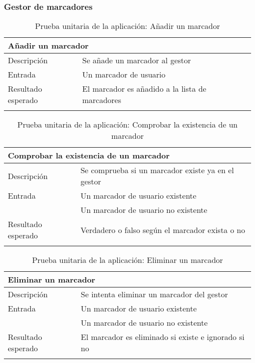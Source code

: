 \subsubsection{Gestor de marcadores}

\begin{longtable}{|p{} p{}|}
    \hline
    \multicolumn{2}{|l|}{\textbf{Añadir un marcador}} \\ \hline 
    Descripción                 & Se añade un marcador al gestor \\ \hline
    Entrada                     & Un marcador de usuario \\ \hline
    Resultado esperado          & El marcador es añadido a la lista de marcadores \\ \hline
    \caption{Prueba unitaria de la aplicación: Añadir un marcador}
    \label{cp:u:app:añadir_marcador}
\end{longtable}

\begin{longtable}{|p{} p{}|}
    \hline
    \multicolumn{2}{|l|}{\textbf{Comprobar la existencia de un marcador}} \\ \hline 
    Descripción                 & Se comprueba si un marcador existe ya en el gestor \\ \hline
    Entrada                     & Un marcador de usuario existente \\
                                & Un marcador de usuario no existente \\\hline
    Resultado esperado          & Verdadero o falso según el marcador exista o no \\ \hline
    \caption{Prueba unitaria de la aplicación: Comprobar la existencia de un marcador}
    \label{cp:u:app:comprobar_marcador}
\end{longtable}

\begin{longtable}{|p{} p{}|}
    \hline
    \multicolumn{2}{|l|}{\textbf{Eliminar un marcador}} \\ \hline 
    Descripción                 & Se intenta eliminar un marcador del gestor \\ \hline
    Entrada                     & Un marcador de usuario existente \\
                                & Un marcador de usuario no existente \\\hline
    Resultado esperado          & El marcador es eliminado si existe e ignorado si no \\ \hline
    \caption{Prueba unitaria de la aplicación: Eliminar un marcador}
    \label{cp:u:app:eliminar_marcador}
\end{longtable}

